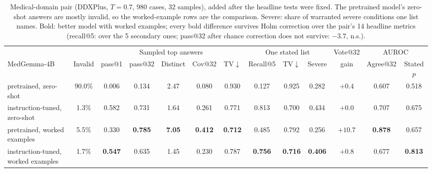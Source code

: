 \documentclass[11pt]{article}
\begin{document}
\begin{table}[t]
\centering\small
\setlength{\tabcolsep}{3pt}
\begin{adjustbox}{max width=\linewidth}
\begin{tabular}{lcccccccccccc}
\toprule
 & & \multicolumn{5}{c}{Sampled top answers} & \multicolumn{3}{c}{One stated list} & Vote@32 & \multicolumn{2}{c}{AUROC} \\
MedGemma-4B & Invalid & pass@1 & pass@32 & Distinct & Cov@32 & TV$\downarrow$ & Recall@5 & TV$\downarrow$ & Severe & gain & Agree@32 & Stated $p$ \\
\midrule
pretrained, zero-shot & 90.0\% & 0.006 & 0.134 & 2.47 & 0.080 & 0.930 & 0.127 & 0.925 & 0.282 & $+0.4$ & 0.607 & 0.518 \\
instruction-tuned, zero-shot & 1.3\% & 0.582 & 0.731 & 1.64 & 0.261 & 0.771 & 0.813 & 0.700 & 0.434 & $+0.0$ & 0.707 & 0.675 \\
\midrule
pretrained, worked examples & 5.5\% & 0.330 & \textbf{0.785} & \textbf{7.05} & \textbf{0.412} & \textbf{0.712} & 0.485 & 0.792 & 0.256 & $+10.7$ & \textbf{0.878} & 0.657 \\
instruction-tuned, worked examples & 1.7\% & \textbf{0.547} & 0.635 & 1.45 & 0.230 & 0.787 & \textbf{0.756} & \textbf{0.716} & \textbf{0.406} & $+0.8$ & 0.677 & \textbf{0.813} \\
\bottomrule
\end{tabular}
\end{adjustbox}
\caption{Medical-domain pair (DDXPlus, $T{=}0.7$, 980 cases, 32 samples), added after the headline tests were fixed. The pretrained model's zero-shot answers are mostly invalid, so the worked-example rows are the comparison. Severe: share of warranted severe conditions one list names. Bold: better model with worked examples; every bold difference survives Holm correction over the pair's 14 headline metrics (recall@5: over the 5 secondary ones; pass@32 after chance correction does not survive: $-3.7$, n.s.).}
\label{tab:medgemma}
\end{table}
\end{document}
